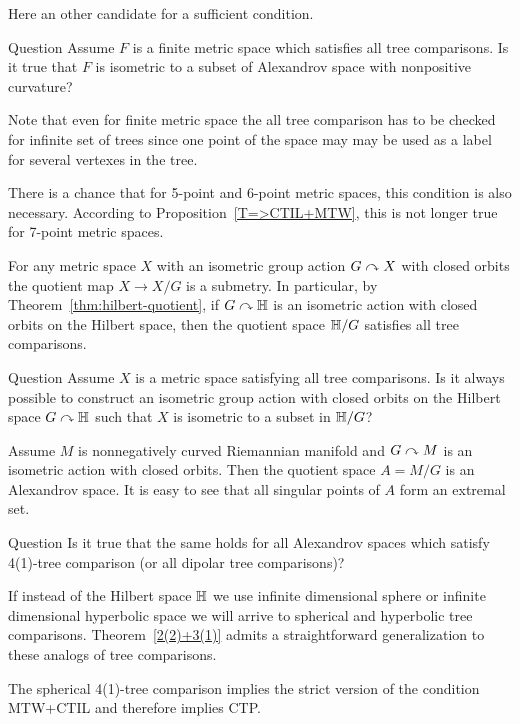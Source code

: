 Here an other candidate for a sufficient condition.

\begin{thm}{Question}
Assume $F$ is a finite metric space which satisfies all tree comparisons.
Is it true that $F$ is isometric to a subset of Alexandrov space with nonpositive curvature?
\end{thm}

Note that even for finite metric space the all tree comparison has to be checked for infinite set of trees since one point of the space may may be used as a label for several vertexes in the tree.

There is a chance that for 5-point and 6-point metric spaces, this condition is also necessary. 
According to Proposition~\ref{T=>CTIL+MTW}, this is not longer true for 7-point metric spaces.

For any metric space $X$ with an isometric group action $G\curvearrowright X$ with closed orbits the quotient map $X\to X/G$ is a submetry.
In particular, by Theorem~\ref{thm:hilbert-quotient}, if $G\curvearrowright \mathbb{H}$ is an isometric action with closed orbits on the Hilbert space, then the quotient space $\mathbb{H}/G$ satisfies all tree comparisons.

\begin{thm}{Question}
Assume $X$ is a metric space satisfying all tree comparisons.
Is it always possible to construct an isometric group action with closed orbits on the Hilbert space $G\curvearrowright \mathbb{H}$ such that $X$ is isometric to a subset in $\mathbb{H}/G$?
\end{thm}

Assume $M$ is nonnegatively curved Riemannian manifold
and $G\curvearrowright M$ is an isometric action with closed orbits.
Then the quotient space $A=M/G$ is an Alexandrov space.
It is easy to see that all singular points of $A$ form an extremal set.

\begin{thm}{Question}
Is it true that the same holds for all Alexandrov spaces which satisfy 4(1)-tree  comparison (or all dipolar tree comparisons)?
\end{thm}

If instead of the Hilbert space $\mathbb{H}$ we use infinite dimensional sphere or infinite dimensional hyperbolic space we will arrive to spherical and hyperbolic tree comparisons.
Theorem~\ref{2(2)+3(1)} admits a straightforward generalization to these analogs of tree comparisons.

The spherical 4(1)-tree comparison implies the strict version of the condition MTW+CTIL and therefore implies CTP.

